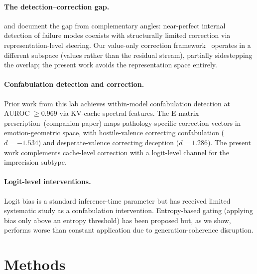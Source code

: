 \documentclass[11pt,a4paper]{article}
\begin{document}
\paragraph{The detection--correction gap.}
\citet{basu2026interpretability} and \citet{liu2026decodable} document the gap
from complementary angles: near-perfect internal detection of failure modes
coexists with structurally limited correction via representation-level
steering. Our value-only correction framework~\citep{pustovit2026knowledge}
operates in a different subspace (values rather than the residual stream),
partially sidestepping the overlap; the present work avoids the representation
space entirely.

\paragraph{Confabulation detection and correction.}
Prior work from this lab achieves within-model confabulation detection at AUROC
$\geq 0.969$ via KV-cache spectral features. The E-matrix
prescription~(companion paper) maps pathology-specific correction vectors in
emotion-geometric space, with hostile-valence correcting confabulation
($d = -1.534$) and desperate-valence correcting deception ($d = 1.286$). The
present work complements cache-level correction with a logit-level channel for
the imprecision subtype.

\paragraph{Logit-level interventions.}
Logit bias is a standard inference-time parameter but has received limited
systematic study as a confabulation intervention. Entropy-based gating
(applying bias only above an entropy threshold) has been proposed but, as we
show, performs worse than constant application due to generation-coherence
disruption.

\section{Methods}
\label{sec:methods}

\end{document}
